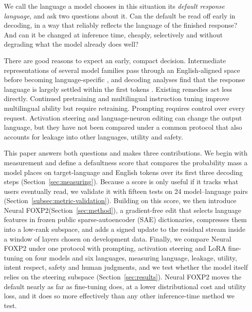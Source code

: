 \documentclass[11pt]{article}
\newcommand{\foxp}{Neural FOXP2\xspace}
\begin{document}
We call the language a model chooses in this situation its \emph{default response language}, and ask two questions about it. Can the default be read off early in decoding, in a way that reliably reflects the language of the finished response? And can it be changed at inference time, cheaply, selectively and without degrading what the model already does well?

There are good reasons to expect an early, compact decision. Intermediate representations of several model families pass through an English-aligned space before becoming language-specific \citep{wendler-etal-2024-llamas}, and decoding analyses find that the response language is largely settled within the first tokens \citep{nie-etal-2025-mechanistic}. Existing remedies act less directly. Continued pretraining and multilingual instruction tuning \citep{lu-etal-2024-llamax,ustun-etal-2024-aya,shaham-etal-2024-multilingual} improve multilingual ability but require retraining. Prompting requires control over every request. Activation steering \citep{rimsky-etal-2024-steering,turner2024steeringlanguagemodelsactivation} and language-neuron editing \citep{tang-etal-2024-language} can change the output language, but they have not been compared under a common protocol that also accounts for leakage into other languages, utility and safety.

This paper answers both questions and makes three contributions. We begin with measurement and define a defaultness score that compares the probability mass a model places on target-language and English tokens over its first three decoding steps (Section~\ref{sec:measuring}). Because a score is only useful if it tracks what users eventually read, we validate it with fifteen tests on 24 model--language pairs (Section~\ref{subsec:metric-validation}). Building on this score, we then introduce \foxp (Section~\ref{sec:method}), a gradient-free edit that selects language features in frozen public sparse-autoencoder (SAE) dictionaries, compresses them into a low-rank subspace, and adds a signed update to the residual stream inside a window of layers chosen on development data. Finally, we compare \foxp under one protocol with prompting, activation steering and LoRA fine-tuning on four models and six languages, measuring language, leakage, utility, intent respect, safety and human judgments, and we test whether the model itself relies on the steering subspace (Section~\ref{sec:results}). \foxp moves the default nearly as far as fine-tuning does, at a lower distributional cost and utility loss, and it does so more effectively than any other inference-time method we test.
\end{document}
